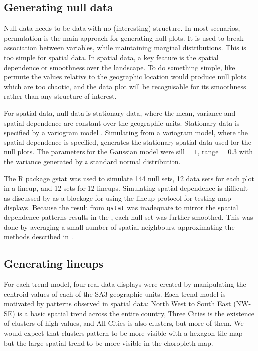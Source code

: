 \documentclass[
doublespace,
  times]{anzsauth}
\begin{document}
\subsection{Generating null data}\label{generating-null-data}

Null data needs to be data with no (interesting) structure. In most
scenarios, permutation is the main approach for generating null plots.
It is used to break association between variables, while maintaining
marginal distributions. This is too simple for spatial data. In spatial
data, a key feature is the spatial dependence or smoothness over the
landscape. To do something simple, like permute the values relative to
the geographic location would produce null plots which are too chaotic,
and the data plot will be recognisable for its smoothness rather than
any structure of interest.

For spatial data, null data is stationary data, where the mean, variance
and spatial dependence are constant over the geographic units.
Stationary data is specified by a variogram model \citep{POG}.
Simulating from a variogram model, where the spatial dependence is
specified, generates the stationary spatial data used for the null
plots. The parameters for the Gaussian model were sill\(=1\),
range\(=0.3\) with the variance generated by a standard normal
distribution.

The \textsf{R} package \textsf{gstat} \citep{gstat} was used to simulate
144 null sets, 12 data sets for each plot in a lineup, and 12 sets for
12 lineups. Simulating spatial dependence is difficult as discussed by
\citet{BDMSTW} as a blockage for using the lineup protocol for testing
map displays. Because the result from \texttt{gstat} was inadequate to
mirror the spatial dependence patterns results in the \citet{atlas},
each null set was further smoothed. This was done by averaging a small
number of spatial neighbours, approximating the methods described in
\citet{atlas-methods}.

\subsection{Generating lineups}\label{generating-lineups}

For each trend model, four real data displays were created by
manipulating the centroid values of each of the SA3 geographic units.
Each trend model is motivated by patterns observed in spatial data:
North West to South East (NW-SE) is a basic spatial trend across the
entire country, Three Cities is the existence of clusters of high
values, and All Cities is also clusters, but more of them. We would
expect that clusters pattern to be more visible with a hexagon tile map
but the large spatial trend to be more visible in the choropleth map.
\end{document}
